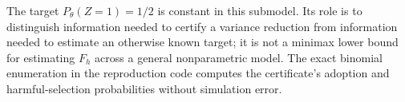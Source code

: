 The target $P_\theta(Z=1)=1/2$ is constant in this submodel. Its role is to distinguish information needed to certify a variance reduction from information needed to estimate an otherwise known target; it is not a minimax lower bound for estimating $F_h$ across a general nonparametric model. The exact binomial enumeration in the reproduction code computes the certificate's adoption and harmful-selection probabilities without simulation error.
